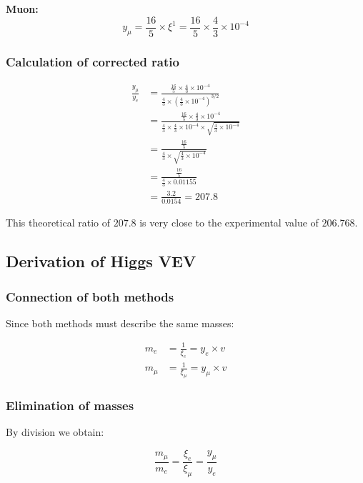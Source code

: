 \documentclass[12pt,a4paper]{article}
\begin{document}
\textbf{Muon:}
\begin{equation}
	y_\mu = \frac{16}{5} \times \xi^1 = \frac{16}{5} \times \frac{4}{3} \times 10^{-4}
\end{equation}

\subsubsection{Calculation of corrected ratio}

\begin{align}
	\frac{y_\mu}{y_e} &= \frac{\frac{16}{5} \times \frac{4}{3} \times 10^{-4}}{\frac{4}{3} \times \left(\frac{4}{3} \times 10^{-4}\right)^{3/2}}\\
	&= \frac{\frac{16}{5} \times \frac{4}{3} \times 10^{-4}}{\frac{4}{3} \times \frac{4}{3} \times 10^{-4} \times \sqrt{\frac{4}{3} \times 10^{-4}}}\\
	&= \frac{\frac{16}{5}}{\frac{4}{3} \times \sqrt{\frac{4}{3} \times 10^{-4}}}\\
	&= \frac{\frac{16}{5}}{\frac{4}{3} \times 0.01155}\\
	&= \frac{3.2}{0.0154} = 207.8
\end{align}

This theoretical ratio of $207.8$ is very close to the experimental value of $206.768$.

\subsection{Derivation of Higgs VEV}

\subsubsection{Connection of both methods}

Since both methods must describe the same masses:

\begin{align}
	m_e &= \frac{1}{\xi_e} = y_e \times v\\
	m_\mu &= \frac{1}{\xi_\mu} = y_\mu \times v
\end{align}

\subsubsection{Elimination of masses}

By division we obtain:

\begin{equation}
	\frac{m_\mu}{m_e} = \frac{\xi_e}{\xi_\mu} = \frac{y_\mu}{y_e}
\end{equation}
\end{document}
